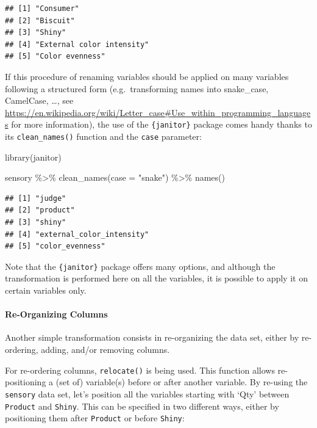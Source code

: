 \documentclass[
]{krantz}
\makeatletter
\newenvironment{Shaded}{\begin{snugshade}}{\end{snugshade}}
\newcommand{\AttributeTok}[1]{\textcolor[rgb]{0.61,0.61,0.61}{#1}}
\newcommand{\FunctionTok}[1]{\textcolor[rgb]{0,0,0}{#1}}
\newcommand{\NormalTok}[1]{#1}
\newcommand{\SpecialCharTok}[1]{\textcolor[rgb]{0,0,0}{#1}}
\newcommand{\StringTok}[1]{\textcolor[rgb]{0.5,0.5,0.5}{#1}}
\newenvironment{kframe}{%
\medskip{}
\setlength{\fboxsep}{.8em}
 \def\at@end@of@kframe{}%
 \ifinner\ifhmode%
  \def\at@end@of@kframe{\end{minipage}}%
  \begin{minipage}{\columnwidth}%
 \fi\fi%
 \def\FrameCommand##1{\hskip\@totalleftmargin \hskip-\fboxsep
 \colorbox{shadecolor}{##1}\hskip-\fboxsep
     \hskip-\linewidth \hskip-\@totalleftmargin \hskip\columnwidth}%
 \MakeFramed {\advance\hsize-\width
   \@totalleftmargin\z@ \linewidth\hsize
   \@setminipage}}%
 {\par\unskip\endMakeFramed%
 \at@end@of@kframe}
\renewenvironment{Shaded}{\begin{kframe}}{\end{kframe}}
\makeatother
\begin{document}
\begin{verbatim}
## [1] "Consumer"                
## [2] "Biscuit"                 
## [3] "Shiny"                   
## [4] "External color intensity"
## [5] "Color evenness"
\end{verbatim}

If this procedure of renaming variables should be applied on many variables following a structured form (e.g.~transforming names into snake\_case, CamelCase, \ldots, see \url{https://en.wikipedia.org/wiki/Letter_case\#Use_within_programming_languages} for more information), the use of the \texttt{\{janitor\}} package comes handy thanks to its \texttt{clean\_names()} function and the \texttt{case} parameter:

\begin{Shaded}
\begin{Highlighting}[]
\FunctionTok{library}\NormalTok{(janitor)}

\NormalTok{sensory }\SpecialCharTok{\%\textgreater{}\%}
  \FunctionTok{clean\_names}\NormalTok{(}\AttributeTok{case =} \StringTok{"snake"}\NormalTok{) }\SpecialCharTok{\%\textgreater{}\%}
  \FunctionTok{names}\NormalTok{()}
\end{Highlighting}
\end{Shaded}

\begin{verbatim}
## [1] "judge"                   
## [2] "product"                 
## [3] "shiny"                   
## [4] "external_color_intensity"
## [5] "color_evenness"
\end{verbatim}

Note that the \texttt{\{janitor\}} package offers many options, and although the transformation is performed here on all the variables, it is possible to apply it on certain variables only.

\hypertarget{re-organizing-columns}{%
\paragraph*{Re-Organizing Columns}\label{re-organizing-columns}}

Another simple transformation consists in re-organizing the data set, either by re-ordering, adding, and/or removing columns.

For re-ordering columns, \texttt{relocate()} is being used. This function allows re-positioning a (set of) variable(s) before or after another variable. By re-using the \texttt{sensory} data set, let's position all the variables starting with `Qty' between \texttt{Product} and \texttt{Shiny}. This can be specified in two different ways, either by positioning them after \texttt{Product} or before \texttt{Shiny}:
\end{document}
